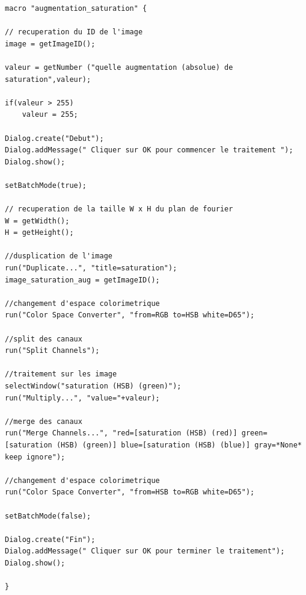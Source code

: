 \documentclass[a4paper,10pt]{article}
\begin{document}
\begin{lstlisting}[caption=Macros de modification de la saturation d'une image]
macro "augmentation_saturation" {

// recuperation du ID de l'image
image = getImageID();

valeur = getNumber ("quelle augmentation (absolue) de saturation",valeur);

if(valeur > 255) 
    valeur = 255;

Dialog.create("Debut");
Dialog.addMessage(" Cliquer sur OK pour commencer le traitement ");
Dialog.show();

setBatchMode(true);

// recuperation de la taille W x H du plan de fourier
W = getWidth();
H = getHeight();

//dusplication de l'image
run("Duplicate...", "title=saturation");
image_saturation_aug = getImageID();

//changement d'espace colorimetrique
run("Color Space Converter", "from=RGB to=HSB white=D65");

//split des canaux
run("Split Channels");

//traitement sur les image
selectWindow("saturation (HSB) (green)");
run("Multiply...", "value="+valeur);

//merge des canaux 
run("Merge Channels...", "red=[saturation (HSB) (red)] green=[saturation (HSB) (green)] blue=[saturation (HSB) (blue)] gray=*None* keep ignore");

//changement d'espace colorimetrique
run("Color Space Converter", "from=HSB to=RGB white=D65");

setBatchMode(false);

Dialog.create("Fin");
Dialog.addMessage(" Cliquer sur OK pour terminer le traitement");
Dialog.show();

}
\end{lstlisting}
\end{document}

